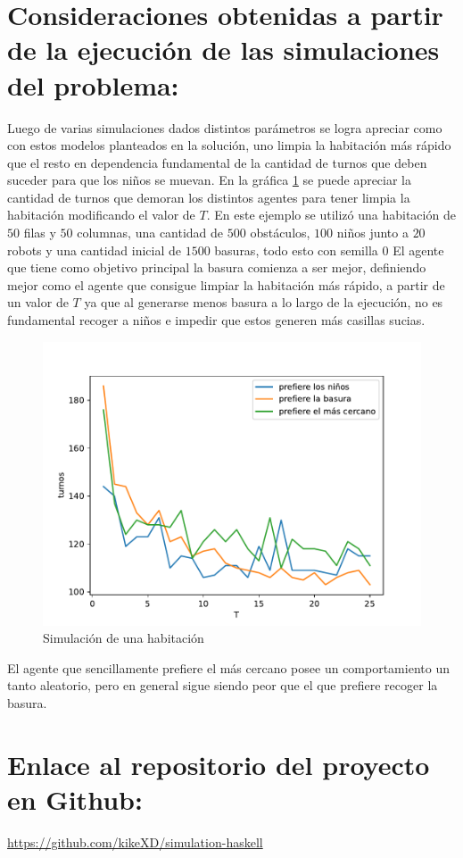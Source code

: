\documentclass[titlepage,11pt]{scrartcl}
\begin{document}
\section{Consideraciones obtenidas a partir de la ejecución de las simulaciones del problema:}
Luego de varias simulaciones dados distintos parámetros se logra apreciar como con estos modelos planteados en la solución, uno limpia la habitación más rápido que el resto en dependencia fundamental de la cantidad de turnos que deben suceder para que los niños se muevan. En la gráfica \ref{fig:simulation} se puede apreciar la cantidad de turnos que demoran los distintos agentes para tener limpia la habitación modificando el valor de $T$. En este ejemplo se utilizó una habitación de $50$ filas y $50$ columnas, una cantidad de $500$ obstáculos, $100$ niños junto a $20$ robots y una cantidad inicial de $1500$ basuras, todo esto con semilla $0$ El agente que tiene como objetivo principal la basura comienza a ser mejor, definiendo mejor como el agente que consigue limpiar la habitación más rápido, a partir de un valor de $T$ ya que al generarse menos basura a lo largo de la ejecución, no es fundamental recoger a niños e impedir que estos generen más casillas sucias.

\begin{figure}[htb]
    \begin{center}
        \includegraphics[width=\columnwidth]{./media/simulation.pdf}
    \end{center}
    \caption{Simulación de una habitación\label{fig:simulation}}
\end{figure}

El agente que sencillamente prefiere el más cercano posee un comportamiento un tanto aleatorio, pero en general sigue siendo peor que el que prefiere recoger la basura.

\section{Enlace al repositorio del proyecto en Github:}
\url{https://github.com/kikeXD/simulation-haskell}
\end{document}
